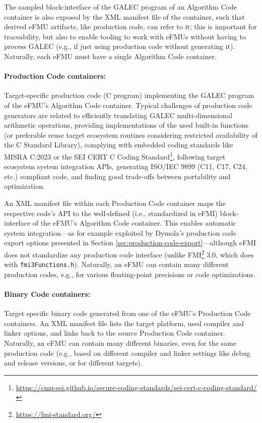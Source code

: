 The sampled block-interface of the GALEC program of an Algorithm Code container is also exposed by the XML manifest file of the container, such that derived eFMU artifacts, like production code, can refer to it; this is important for traceability, but also to enable tooling to work with eFMUs without having to process GALEC (e.g., if just using production code without generating it). Naturally, each eFMU must have a single Algorithm Code container.

\paragraph{Production Code containers:} Target-specific production code (C program) implementing the GALEC program of the eFMU's Algorithm Code container. Typical challenges of production code generators are related to efficiently translating GALEC multi-dimensional arithmetic operations, providing implementations of the used built-in functions (or preferable reuse target ecosystem routines considering restricted availability of the C Standard Library), complying with embedded coding standards like MISRA C:2023 or the SEI CERT C Coding Standard\footnote{\label{fnt:sei-cert-c}\tiny{\url{https://cmu-sei.github.io/secure-coding-standards/sei-cert-c-coding-standard/}}}, following target ecosystem system integration APIs, generating ISO/IEC 9899 (C11, C17, C24, etc.) compliant code, and finding good trade-offs between portability and optimization.

An XML manifest file within each Production Code container maps the respective code's API to the well-defined (i.e., standardized in eFMI) block-interface of the eFMU's Algorithm Code container. This enables automatic system integration---as for example exploited by Dymola's production code export options presented in Section \ref{sec:production-code-export}---although eFMI does not standardize any production code interface (unlike FMI\footnote{\label{fnt:fmi}\tiny{\url{https://fmi-standard.org/}}} 3.0, which does with \texttt{fmi3Functions.h}). Naturally, an eFMU can contain many different production codes, e.g., for various floating-point precisions or code optimizations.

\paragraph{Binary Code containers:} Target specific binary code generated from one of the eFMU's Production Code containers. An XML manifest file lists the target platform, used compiler and linker options, and links back to the source Production Code container. Naturally, an eFMU can contain many different binaries, even for the same production code (e.g., based on different compiler and linker settings like debug and release versions, or for different targets).

